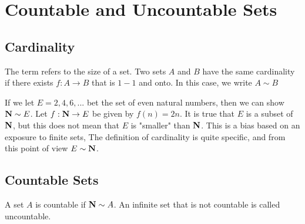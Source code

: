 \section{Countable and Uncountable Sets}
\subsection{Cardinality}
The term  refers to the size of a set. 
\indent Two sets $ A $ and $ B $ have the same cardinality if there exists $ f: A \rightarrow B $ that is $ 1-1 $ and onto. In this case, we write $ A \sim B $\\

\begin{example}
	If we let $ E = {2,4,6,...} $ bet the set of even natural numbers, then we can show $ \textbf{N} \sim E $. Let $ f: \textbf{N} \rightarrow E $ be given by $ f(n) = 2n $. It is true that $ E $ is a subset of $ \textbf{N} $, but this does not mean that $ E $ is "smaller" than $ \textbf{N} $. This is a bias based on an exposure to finite sets, The definition of cardinality is quite specific, and from this point of view $ E \sim \textbf{N} $.
\end{example}
\subsection{Countable Sets}
A set $ A $ is countable if $ \textbf{N} \sim A $. An infinite set that is not countable is called uncountable. 